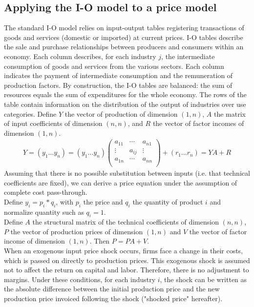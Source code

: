 \documentclass[11pt,a4paper]{article}
\begin{document}
\subsection{Applying the I-O model to a price model}
\label{subsec:ioprice}
The standard I-O model relies on input-output tables registering transactions of goods and services (domestic or imported) at current prices. I-O tables describe the sale and purchase relationships between producers and consumers within an economy. Each column describes, for each industry $j$, the intermediate consumption of goods and services from the various sectors. Each column indicates the payment of intermediate consumption and the remuneration of production factors. By construction, the I-O tables are balanced: the sum of resources equals the sum of expenditures for the whole economy. The rows of the table contain information on the distribution of the output of industries over use categories.
Define $Y$ the vector of production of dimension $(1, n)$, $A$ the matrix of input coefficients of dimension $(n, n)$, and $R$ the vector of factor incomes of dimension $(1, n)$.\\
\begin{eqnarray*}
	Y=(y_1\ldots y_n)=\left(y_1\ldots y_n\right)\left( \begin{matrix}
   a_{11} & \cdots  & a_{n1}  \\
   \vdots  & a_{ij} & \vdots   \\
   a_{1n} & \cdots  & a_{nn}  \\
\end{matrix} \right)+(r_1\ldots r_n)=YA+R
\end{eqnarray*}
Assuming that there is no possible substitution between inputs (i.e. that technical coefficients are fixed), we can derive a price equation under the assumption of complete cost pass-through.\\
Define $y_i=p_i*q_i$, with $p_i$ the price and $q_i$ the quantity of product $i$ and normalize quantity such as $q_i=1$. \\
Define $A$ the structural matrix of the technical coefficients of dimension $(n, n)$, $P$ the vector of production prices of dimension $(1, n)$ and $V$ the vector of factor income of dimension $(1, n)$. Then $P=PA+V$. \\
When an exogenous input price shock occurs, firms face a change in their costs, which is passed on directly to production prices. This exogenous shock is assumed not to affect the return on capital and labor. Therefore, there is no adjustment to margins. Under these conditions, for each industry $i$, the shock can be written as the absolute difference between the initial production price and the new production price invoiced following the shock ("shocked price" hereafter).\\
\end{document}
